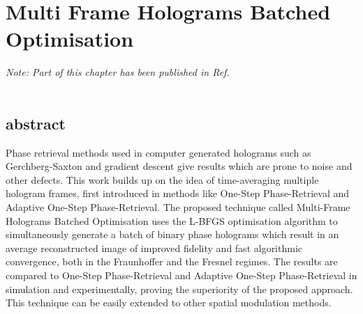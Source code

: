\chapter{Multi Frame Holograms Batched Optimisation}
\label{chapter:Multi Frame Holograms Batched Optimisation}

\graphicspath{{Chapter_MFHBO/Figs/}}

\textit{Note: Part of this chapter has been published in Ref. \cite{Sha2024MFHBO}}\\\\


\section{abstract}
	Phase retrieval methods used in computer generated holograms such as Gerchberg-Saxton and gradient descent give results which are prone to noise and other defects. This work builds up on the idea of time-averaging multiple hologram frames, first introduced in methods like One-Step Phase-Retrieval and Adaptive One-Step Phase-Retrieval. The proposed technique called Multi-Frame Holograms Batched Optimisation  uses the L-BFGS optimisation algorithm to simultaneously generate a batch of binary phase holograms which result in an average reconstructed image of improved fidelity and fast algorithmic convergence, both in the Fraunhoffer and the Fresnel regimes. The results are compared to One-Step Phase-Retrieval and Adaptive One-Step Phase-Retrieval in simulation and experimentally, proving the superiority of the proposed approach. This technique can be easily extended to other spatial modulation methods.

